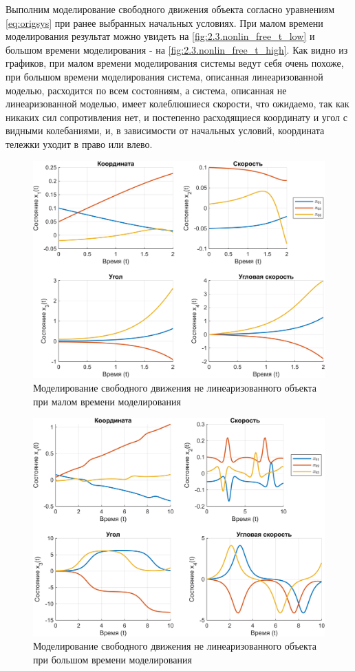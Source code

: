 \noindent Выполним моделирование свободного движения объекта согласно уравнениям \eqref{eq:origsys}
при ранее выбранных начальных условиях. При малом времени
моделирования результат можно увидеть на \autoref{fig:2.3.nonlin_free_t_low} 
и большом времени моделирования - на \autoref{fig:2.3.nonlin_free_t_high}.
\noindent Как видно из графиков, при малом времени моделирования системы ведут себя очень похоже,
при большом времени моделирования система, описанная линеаризованной моделью, расходится по всем состояниям,
а система, описанная не линеаризованной моделью, имеет колеблюшиеся скорости, что ожидаемо, так как
никаких сил сопротивления нет, и постепенно расходящиеся
координату и угол с видными колебаниями, и, в зависимости от начальных условий, координата тележки уходит
в право или влево.

\begin{figure}[H]
    \centering
    \includegraphics[width=0.8\linewidth]{figs/2.3.nonlin_free_t_low.png}
    \caption{Моделирование свободного движения не линеаризованного объекта
    при малом времени моделирования}
    \label{fig:2.3.nonlin_free_t_low}
\end{figure}
\begin{figure}[H]
    \centering
    \includegraphics[width=0.8\linewidth]{figs/2.3.nonlin_free_t_high.png}
    \caption{Моделирование свободного движения не линеаризованного объекта
    при большом времени моделирования}
    \label{fig:2.3.nonlin_free_t_high}
\end{figure}

